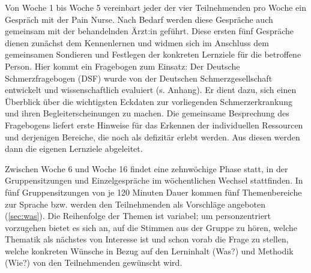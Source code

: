 \documentclass[
  twoside,
  parskip=half-,
]{scrreprt}
\begin{document}
Von Woche 1 bis Woche 5 vereinbart jeder der vier Teilnehmenden pro Woche ein Gespräch mit der Pain Nurse. Nach Bedarf werden diese Gespräche auch gemeinsam mit der behandelnden Ärzt:in geführt. Diese ersten fünf Gespräche dienen zunächst dem Kennenlernen und widmen sich im Anschluss dem gemeinsamen Sondieren und Festlegen der konkreten Lernziele für die betroffene Person. Hier kommt ein Fragebogen zum Einsatz: Der Deutsche Schmerzfragebogen (DSF) wurde von der Deutschen Schmerzgesellschaft entwickelt und wissenschaftlich evaluiert (s. Anhang). Er dient dazu, sich einen Überblick über die wichtigsten Eckdaten zur vorliegenden Schmerzerkrankung und ihren Begleiterscheinungen zu machen. Die gemeinsame Besprechung des Fragebogens liefert erste Hinweise für das Erkennen  der individuellen Ressourcen und derjenigen Bereiche, die noch als defizitär erlebt werden. Aus diesen werden dann die eigenen Lernziele abgeleitet. 

Zwischen Woche 6 und Woche 16 findet eine zehnwöchige Phase statt, in der Gruppensitzungen und Einzelgespräche im wöchentlichen Wechsel stattfinden. In fünf Gruppensitzungen von je 120 Minuten Dauer kommen fünf Themenbereiche zur Sprache bzw. werden den Teilnehmenden als Vorschläge angeboten (\autoref{sec:was}). Die Reihenfolge der Themen ist variabel; um personzentriert vorzugehen bietet es sich an, auf die Stimmen aus der Gruppe zu hören, welche Thematik als nächstes von Interesse ist und schon vorab die Frage zu stellen, welche konkreten Wünsche in Bezug auf den Lerninhalt (Was?) und Methodik (Wie?) von den Teilnehmenden gewünscht wird.
\end{document}
